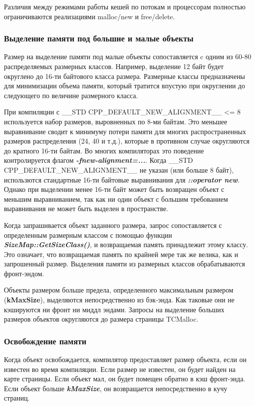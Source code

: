 Различия между режимами работы кешей по потокам и процессорам полностью ограничиваются реализациями malloc/new и free/delete.

\subsubsection{Выделение памяти под большие и малые объекты}

Размер на выделение памяти под малые объекты сопоставляется c одним из 60-80 распределяемых размерных классов. Например, выделение 12 байт будет округлено до 16-ти байтового класса размера. Размерные классы предназначены для минимизации объема памяти, который тратится впустую при округлении до следующего по величине размерного класса.

При компиляции с  \_\_STD CPP\_DEFAULT\_NEW\_ALIGNMENT\_\_ <= 8 используется набор размеров, выровненных по 8-ми байтам. Это меньшее выравнивание сводит к минимуму потери памяти для многих распространенных размеров распределения (24, 40 и т.д.), которые в противном случае округляются до кратного 16-ти байтам. Во многих компиляторах это поведение контролируется флагом \textbf{\textit{-fnew-alignment=...}}. Когда \_\_STD CPP\_DEFAULT\_NEW\_ALIGNMENT\_\_ не указан (или больше 8 байт), использются стандартные 16-ти байтовые выравнивания для \textit{\textbf{::operator new}}. Однако при выделении менее 16-ти байт может быть возвращен объект с меньшим выравниванием, так как ни один объект с большим требованием выравнивания не может быть выделен в пространстве.

Когда запрашивается объект заданного размера, запрос сопоставляется с определенным размерным классом с помощью функции \textit{\textbf{SizeMap::GetSizeClass()}}, и возвращаемая память принадлежит этому классу. Это означает, что возвращаемая память по крайней мере так же велика, как и запрошенный размер. Выделения памяти из размерных классов обрабатываются фронт-эндом.

Объекты размером больше предела, определенного максимальным размером (\textbf{kMaxSize}), выделяются непосредственно из бэк-энда. Как таковые они не кэшируются ни фронт ни миддл эндами. Запросы на выделение больших размеров объектов округляются до размера страницы TCMalloc.

\subsubsection{Освобождение памяти}

Когда объект освобождается, компилятор предоставляет размер объекта, если он известен во время компиляции. Если размер не известен, он будет найден на карте страницы. Если объект мал, он будет помещен обратно в кэш фронт-энда. Если объект больше \textbf{\textit{kMaxSize}}, он возвращается непосредственно в кучу страниц.

